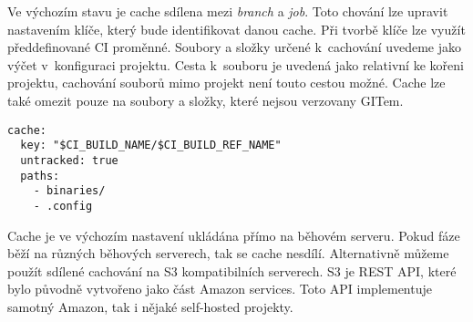 Ve výchozím stavu je cache sdílena mezi \textit{branch} a \textit{job}.
Toto chování lze upravit nastavením klíče, který bude identifikovat danou cache.
Při tvorbě klíče lze využít předdefinované CI proměnné. 
Soubory a složky určené k~cachování uvedeme jako výčet v~konfiguraci projektu.
Cesta k~souboru je uvedená jako relativní ke kořeni projektu, cachování souborů mimo projekt není touto cestou možné. 
Cache lze také omezit pouze na soubory a složky, které nejsou verzovany GITem.

\begin{verbatim}
cache:
  key: "$CI_BUILD_NAME/$CI_BUILD_REF_NAME"
  untracked: true
  paths:
    - binaries/
    - .config
\end{verbatim}
 
Cache je ve výchozím nastavení ukládána přímo na běhovém serveru.
Pokud fáze běží na různých běhových serverech, tak se cache nesdílí.
Alternativně můžeme použít sdílené cachování na S3 kompatibilních serverech.
S3 je REST API, které bylo původně vytvořeno jako část Amazon services.
Toto API implementuje samotný Amazon, tak i nějaké self-hosted projekty.



